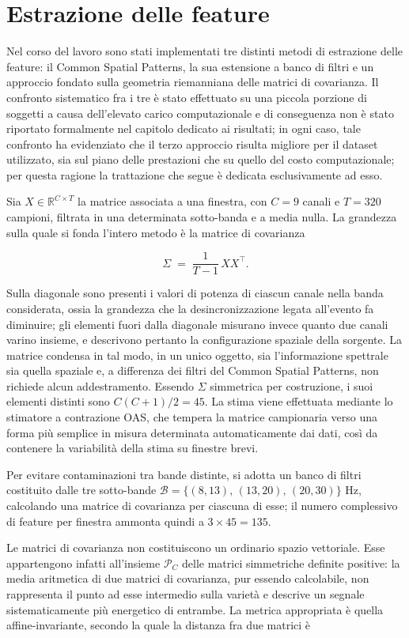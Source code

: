\section{Estrazione delle feature}
Nel corso del lavoro sono stati implementati tre distinti metodi di estrazione delle feature: il Common Spatial Patterns, la sua estensione a banco di filtri e un approccio fondato sulla geometria riemanniana delle matrici di covarianza. Il confronto sistematico fra i tre è stato effettuato su una piccola porzione di soggetti a causa dell'elevato carico computazionale e di conseguenza non è stato riportato formalmente nel capitolo dedicato ai risultati; in ogni caso, tale confronto ha evidenziato che il terzo approccio risulta migliore per il dataset utilizzato, sia sul piano delle prestazioni che su quello del costo computazionale; per questa ragione la trattazione che segue è dedicata esclusivamente ad esso.

Sia $X \in \mathbb{R}^{C \times T}$ la matrice associata a una finestra, con $C = 9$ canali e $T = 320$ campioni, filtrata in una determinata sotto-banda e a media nulla. La grandezza sulla quale si fonda l’intero metodo è la matrice di covarianza

\[
\Sigma \;=\; \frac{1}{T-1}\, X X^{\top} .
\]

Sulla diagonale sono presenti i valori di potenza di ciascun canale nella banda considerata, ossia la grandezza che la desincronizzazione legata all’evento fa diminuire; gli elementi fuori dalla diagonale misurano invece quanto due canali varino insieme, e descrivono pertanto la configurazione spaziale della sorgente. La matrice condensa in tal modo, in un unico oggetto, sia l’informazione spettrale sia quella spaziale e, a differenza dei filtri del Common Spatial Patterns, non richiede alcun addestramento. Essendo $\Sigma$ simmetrica per costruzione, i suoi elementi distinti sono $C(C+1)/2 = 45$. La stima viene effettuata mediante lo stimatore a contrazione OAS, che tempera la matrice campionaria verso una forma più semplice in misura determinata automaticamente dai dati, così da contenere la variabilità della stima su finestre brevi.

Per evitare contaminazioni tra bande distinte, si adotta un banco di filtri costituito dalle tre sotto-bande $\mathcal{B} = \{(8,13),\,(13,20),\,(20,30)\}$ Hz, calcolando una matrice di covarianza per ciascuna di esse; il numero complessivo di feature per finestra ammonta quindi a $3 \times 45 = 135$.

Le matrici di covarianza non costituiscono un ordinario spazio vettoriale. Esse appartengono infatti all’insieme $\mathcal{P}_C$ delle matrici simmetriche definite positive: la media aritmetica di due matrici di covarianza, pur essendo calcolabile, non rappresenta il punto ad esse intermedio sulla varietà e descrive un segnale sistematicamente più energetico di entrambe. La metrica appropriata è quella affine-invariante, secondo la quale la distanza fra due matrici è

